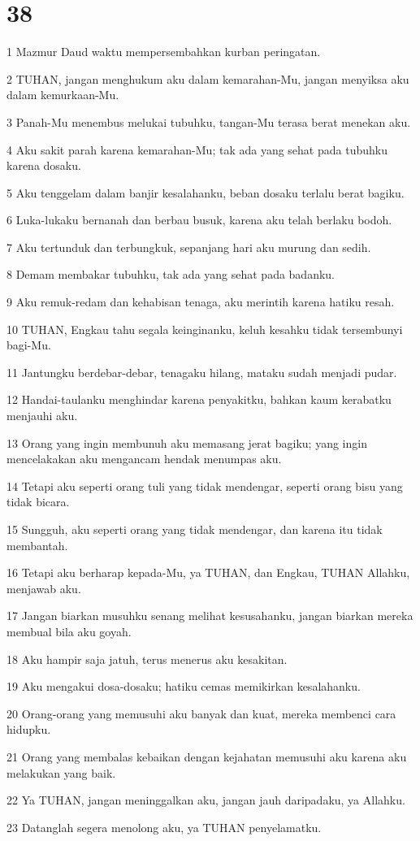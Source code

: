 \chapter{38}

\par 1 Mazmur Daud waktu mempersembahkan kurban peringatan.
\par 2 TUHAN, jangan menghukum aku dalam kemarahan-Mu, jangan menyiksa aku dalam kemurkaan-Mu.
\par 3 Panah-Mu menembus melukai tubuhku, tangan-Mu terasa berat menekan aku.
\par 4 Aku sakit parah karena kemarahan-Mu; tak ada yang sehat pada tubuhku karena dosaku.
\par 5 Aku tenggelam dalam banjir kesalahanku, beban dosaku terlalu berat bagiku.
\par 6 Luka-lukaku bernanah dan berbau busuk, karena aku telah berlaku bodoh.
\par 7 Aku tertunduk dan terbungkuk, sepanjang hari aku murung dan sedih.
\par 8 Demam membakar tubuhku, tak ada yang sehat pada badanku.
\par 9 Aku remuk-redam dan kehabisan tenaga, aku merintih karena hatiku resah.
\par 10 TUHAN, Engkau tahu segala keinginanku, keluh kesahku tidak tersembunyi bagi-Mu.
\par 11 Jantungku berdebar-debar, tenagaku hilang, mataku sudah menjadi pudar.
\par 12 Handai-taulanku menghindar karena penyakitku, bahkan kaum kerabatku menjauhi aku.
\par 13 Orang yang ingin membunuh aku memasang jerat bagiku; yang ingin mencelakakan aku mengancam hendak menumpas aku.
\par 14 Tetapi aku seperti orang tuli yang tidak mendengar, seperti orang bisu yang tidak bicara.
\par 15 Sungguh, aku seperti orang yang tidak mendengar, dan karena itu tidak membantah.
\par 16 Tetapi aku berharap kepada-Mu, ya TUHAN, dan Engkau, TUHAN Allahku, menjawab aku.
\par 17 Jangan biarkan musuhku senang melihat kesusahanku, jangan biarkan mereka membual bila aku goyah.
\par 18 Aku hampir saja jatuh, terus menerus aku kesakitan.
\par 19 Aku mengakui dosa-dosaku; hatiku cemas memikirkan kesalahanku.
\par 20 Orang-orang yang memusuhi aku banyak dan kuat, mereka membenci cara hidupku.
\par 21 Orang yang membalas kebaikan dengan kejahatan memusuhi aku karena aku melakukan yang baik.
\par 22 Ya TUHAN, jangan meninggalkan aku, jangan jauh daripadaku, ya Allahku.
\par 23 Datanglah segera menolong aku, ya TUHAN penyelamatku.

